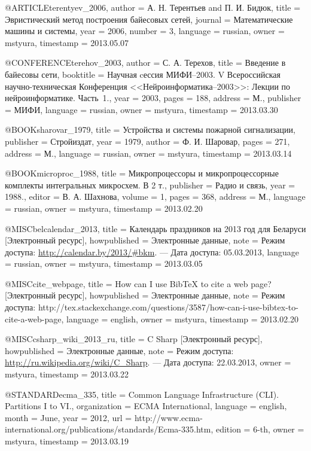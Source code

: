 @ARTICLE{terentyev_2006,
  author = {А. Н. Терентьев and П. И. Бидюк},
  title = {Эвристический метод построения байесовых сетей},
  journal = {Математические машины и системы},
  year = {2006},
  number = {3},
  language = {russian},
  owner = {mstyura},
  timestamp = {2013.05.07}
}

@CONFERENCE{terehov_2003,
  author = {С. А. Терехов},
  title = {Введение в байесовы сети},
  booktitle = {Научная cессия МИФИ--2003. V Всероссийская научно-техническая Конференция
	<<Нейроинформатика--2003>>: Лекции по нейроинформатике. Часть~1.},
  year = {2003},
  pages = {188},
  address = {М.},
  publisher = {МИФИ},
  language = {russian},
  owner = {mstyura},
  timestamp = {2013.03.30}
}

@BOOK{sharovar_1979,
  title = {Устройства и системы пожарной сигнализации},
  publisher = {Стройиздат},
  year = {1979},
  author = {Ф. И. Шаровар},
  pages = {271},
  address = {М.},
  language = {russian},
  owner = {mstyura},
  timestamp = {2013.03.14}
}

@BOOK{microproc_1988,
  title = {Микропроцессоры и микропроцессорные комплекты интегральных микросхем.
	В 2 т.},
  publisher = {Радио и связь},
  year = {1988.},
  editor = {В. А. Шахнова},
  volume = {1},
  pages = {368},
  address = {М.},
  language = {russian},
  owner = {mstyura},
  timestamp = {2013.02.20}
}

@MISC{belcalendar_2013,
  title = {Календарь праздников на 2013 год для Беларуси [Электронный ресурс]},
  howpublished = {Электронные данные},
  note = {Режим доступа: \url{http://calendar.by/2013/\#bkm}. --- Дата доступа:
	05.03.2013},
  language = {russian},
  owner = {mstyura},
  timestamp = {2013.03.05}
}

@MISC{cite_webpage,
  title = {How can I use BibTeX to cite a web page? [Электронный ресурс]},
  howpublished = {Электронные данные},
  note = {Режим доступа: http://tex.stackexchange.com/questions/3587/how-can-i-use-bibtex-to-cite-a-web-page},
  language = {english},
  owner = {mstyura},
  timestamp = {2013.02.20}
}

@MISC{csharp_wiki_2013_ru,
  title = {C Sharp [Электронный ресурс]},
  howpublished = {Электронные данные},
  note = {Режим доступа: \url{http://ru.wikipedia.org/wiki/C\_Sharp}. --- Дата
	доступа: 22.03.2013},
  owner = {mstyura},
  timestamp = {2013.03.22}
}

@STANDARD{ecma_335,
  title = {Common Language Infrastructure (CLI). Partitions I to VI.},
  organization = {ECMA International},
  language = {english},
  month = {June},
  year = {2012},
  url = {http://www.ecma-international.org/publications/standards/Ecma-335.htm},
  edition = {6-th},
  owner = {mstyura},
  timestamp = {2013.03.19}
}

